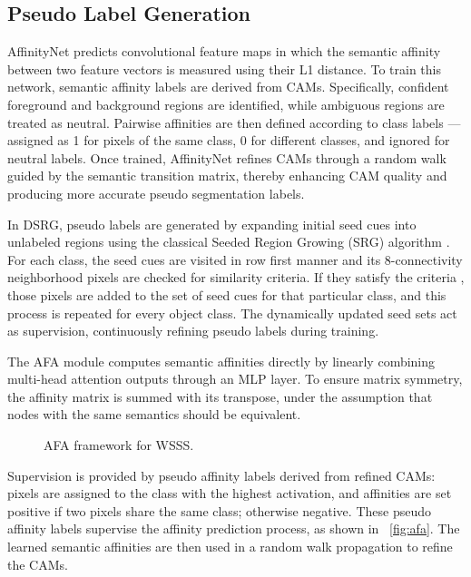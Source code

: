 \subsection{Pseudo Label Generation}
\label{subsec:pseudo-label-generation}
AffinityNet\cite{wsss_affinitynet} predicts convolutional feature maps in which the semantic affinity between two feature vectors is measured using their L1 distance. To train this network, semantic affinity labels are derived from CAMs. Specifically, confident foreground and background regions are identified, while ambiguous regions are treated as neutral. Pairwise affinities are then defined according to class labels — assigned as 1 for pixels of the same class, 0 for different classes, and ignored for neutral labels. Once trained, AffinityNet refines CAMs through a random walk guided by the semantic transition matrix, thereby enhancing CAM quality and producing more accurate pseudo segmentation labels.

In DSRG\cite{wsss_dsrg_deep_seeded_region_growing}, pseudo labels are generated by expanding initial seed cues into unlabeled regions using the classical Seeded Region Growing (SRG) algorithm \cite{srg}. For each class, the seed cues are visited in row first manner and its 8-connectivity neighborhood pixels are checked for similarity criteria. If they satisfy the criteria , those pixels are added to the set of seed cues for that particular class, and this process is repeated for every object class. The dynamically updated seed sets act as supervision, continuously refining pseudo labels during training.

The AFA\cite{wsss_afa_affinity_from_attention} module computes semantic affinities directly by linearly combining multi-head attention outputs through an MLP layer. To ensure matrix symmetry, the affinity matrix is summed with its transpose, under the assumption that nodes with the same semantics should be equivalent. 
\begin{figure}[htbp]
    \centering
    \caption{AFA framework for WSSS.}
    \label{fig:afa}
\end{figure}
Supervision is provided by pseudo affinity labels derived from refined CAMs: pixels are assigned to the class with the highest activation, and affinities are set positive if two pixels share the same class; otherwise negative. These pseudo affinity labels supervise the affinity prediction process, as shown in ~\autoref{fig:afa}. The learned semantic affinities are then used in a random walk propagation to refine the CAMs.

